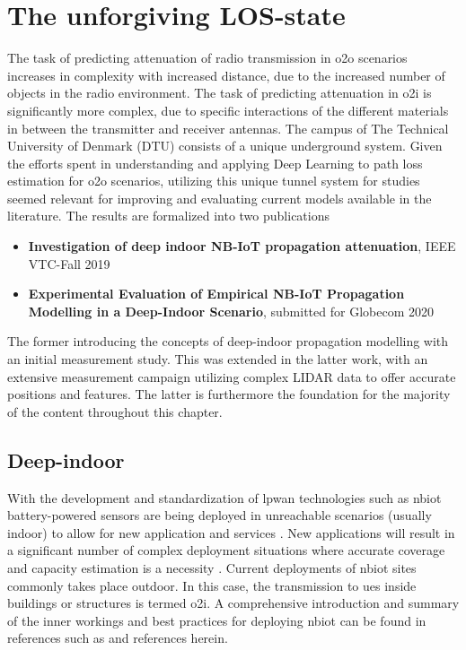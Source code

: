 \chapter{The unforgiving LOS-state}\label{ch:deepindoor}
The task of predicting attenuation of radio transmission in \gls{o2o} scenarios increases in complexity with increased distance, due to the increased number of objects in the radio environment. The task of predicting attenuation in \gls{o2i} is significantly more complex, due to specific interactions of the different materials in between the transmitter and receiver antennas. The campus of The Technical University of Denmark (DTU) consists of a unique underground system. Given the efforts spent in understanding and applying Deep Learning to path loss estimation for \gls{o2o} scenarios, utilizing this unique tunnel system for studies seemed relevant for improving and evaluating current models available in the literature. The results are formalized into two publications

\begin{itemize}
    \item \textbf{Investigation of deep indoor NB-IoT propagation attenuation}, IEEE VTC-Fall 2019 \cite{Malarski2019InvestigationAttenuation}
    \item \textbf{Experimental Evaluation of Empirical NB-IoT Propagation Modelling in a Deep-Indoor Scenario}, submitted for Globecom 2020 \cite{Thrane2020ExperimentalScenario}
\end{itemize}

The former introducing the concepts of deep-indoor propagation modelling with an initial measurement study. This was extended in the latter work, with an extensive measurement campaign utilizing complex LIDAR data to offer accurate positions and features. The latter is furthermore the foundation for the majority of the content throughout this chapter. 

\section{Deep-indoor}

With the development and standardization of \gls{lpwan} technologies such as \gls{nbiot} battery-powered sensors are being deployed in unreachable scenarios (usually indoor) to allow for new application and services \cite{Sinha2017ANB-IoT}. New applications will result in a significant number of complex deployment situations where accurate coverage and capacity estimation is a necessity \cite{Lauridsen2016CoverageArea, Vejlgaard2017}. Current deployments of \gls{nbiot} sites commonly takes place outdoor. In this case, the transmission to \glspl{ue} inside buildings or structures is termed \gls{o2i}. A comprehensive introduction and summary of the inner workings and best practices for deploying \gls{nbiot} can be found in references such as \cite{Sinha2017ANB-IoT, Li2018SmartNB-IoT, Chen2017NarrowThings} and references herein.

